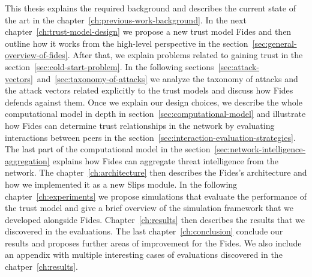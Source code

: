 This thesis explains the required background and describes the current state of the art in the chapter~\ref{ch:previous-work-background}.
In the next chapter~\ref{ch:trust-model-design} we propose a new trust model Fides and then outline how it works from the high-level perspective in the section~\ref{sec:general-overview-of-fides}.
After that, we explain problems related to gaining trust in the section~\ref{sec:cold-start-problem}.
In the following sections~\ref{sec:attack-vectors}~and~\ref{sec:taxonomy-of-attacks} we analyze the taxonomy of attacks and the attack vectors related explicitly to the trust models and discuss how Fides defends against them.
Once we explain our design choices, we describe the whole computational model in depth in section~\ref{sec:computational-model} and illustrate how Fides can determine trust relationships in the network by evaluating interactions between peers in the section~\ref{sec:interaction-evaluation-strategies}.
The last part of the computational model in the section~\ref{sec:network-intelligence-aggregation} explains how Fides can aggregate threat intelligence from the network.
The chapter~\ref{ch:architecture} then describes the Fides's architecture and how we implemented it as a new Slips module.
In the following chapter~\ref{ch:experiments} we propose simulations that evaluate the performance of the trust model and give a brief overview of the simulation framework that we developed alongside Fides.
Chapter~\ref{ch:results} then describes the results that we discovered in the evaluations. The last chapter~\ref{ch:conclusion} conclude our results and proposes further areas of improvement for the Fides. 
We also include an appendix with multiple interesting cases of evaluations discovered in the chatper~\ref{ch:results}.